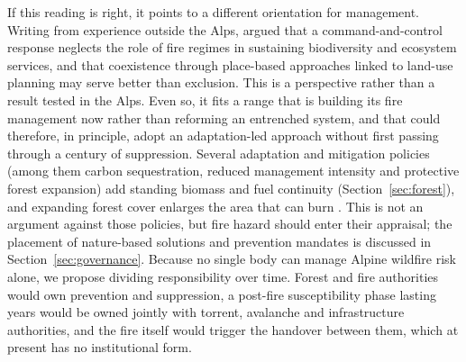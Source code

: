 \documentclass[11pt,a4paper]{article}
\begin{document}
If this reading is right, it points to a different orientation for management. Writing from experience outside the Alps, \citet{moritz_learning_2014} argued that a command-and-control response neglects the role of fire regimes in sustaining biodiversity and ecosystem services, and that coexistence through place-based approaches linked to land-use planning may serve better than exclusion. This is a perspective rather than a result tested in the Alps. Even so, it fits a range that is building its fire management now rather than reforming an entrenched system, and that could therefore, in principle, adopt an adaptation-led approach without first passing through a century of suppression. Several adaptation and mitigation policies (among them carbon sequestration, reduced management intensity and protective forest expansion) add standing biomass and fuel continuity (Section~\ref{sec:forest}), and expanding forest cover enlarges the area that can burn \citep{gerberding_mapping_2025}. This is not an argument against those policies, but fire hazard should enter their appraisal; the placement of nature-based solutions and prevention mandates is discussed in Section~\ref{sec:governance}. Because no single body can manage Alpine wildfire risk alone, we propose dividing responsibility over time. Forest and fire authorities would own prevention and suppression, a post-fire susceptibility phase lasting years would be owned jointly with torrent, avalanche and infrastructure authorities, and the fire itself would trigger the handover between them, which at present has no institutional form.
\end{document}
